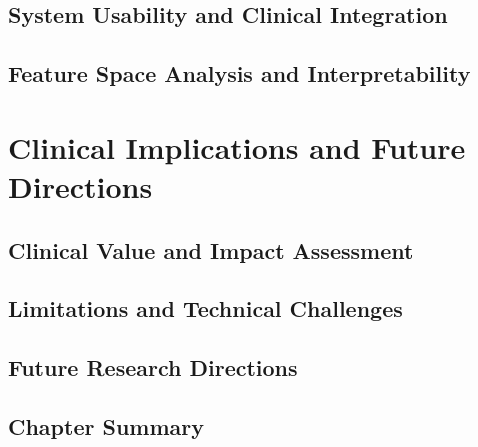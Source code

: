 \subsection{System Usability and Clinical Integration}

\subsection{Feature Space Analysis and Interpretability}

\section{Clinical Implications and Future Directions}

\subsection{Clinical Value and Impact Assessment}

\subsection{Limitations and Technical Challenges}

\subsection{Future Research Directions}

\subsection{Chapter Summary}

